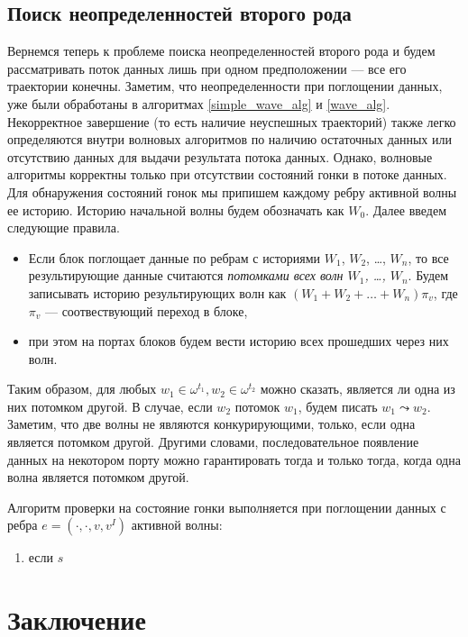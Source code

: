 \documentclass[10pt,a4paper]{article}
\begin{document}
\subsection{Поиск неопределенностей второго рода}
  Вернемся теперь к проблеме поиска неопределенностей второго рода и будем рассматривать поток данных лишь при одном предположении --- все его траектории конечны.
  Заметим, что неопределенности при поглощении данных, уже были обработаны в алгоритмах \ref{simple_wave_alg} и \ref{wave_alg}.
  Некорректное завершение (то есть наличие неуспешных траекторий) также легко определяются внутри волновых алгоритмов
  по наличию остаточных данных или отсутствию данных для выдачи результата потока данных.
  Однако, волновые алгоритмы корректны только при отсутствии состояний гонки в потоке данных.
  Для обнаружения состояний гонок мы припишем каждому ребру активной волны ее историю.
  Историю начальной волны будем обозначать как $W_0$. Далее введем следующие правила.
  \begin{itemize}
    \item Если блок поглощает данные по ребрам с историями $W_1$, $W_2$, \dots, $W_n$, то
    все результирующие данные считаются \textit{потомками всех волн $W_1$, \dots, $W_n$}. Будем записывать историю результирующих волн как $(W_1 + W_2 + \dots + W_n) \pi_v$,
    где $\pi_v$ --- соотвествующий переход в блоке,
    \item при этом на портах блоков будем вести историю всех прошедших через них волн.
  \end{itemize}
  
  Таким образом, для любых $w_1 \in \omega^{t_1}, w_2 \in \omega^{t_2}$ можно сказать, является ли одна из них потомком другой.
  В случае, если $w_2$ потомок $w_1$, будем писать $w_1 \leadsto w_2$. Заметим, что две волны не являются конкурирующими, только, если одна является потомком другой.
  Другими словами, последовательное появление данных на некотором порту можно гарантировать тогда и только тогда, когда одна волна является потомком другой.
  
  Алгоритм проверки на состояние гонки выполняется при поглощении данных с ребра $e = (\cdot, \cdot, v, v^I)$ активной волны:
  \begin{enumerate}
    \item если $s$
  \end{enumerate}
  
  

\section{Заключение}
\end{document}
